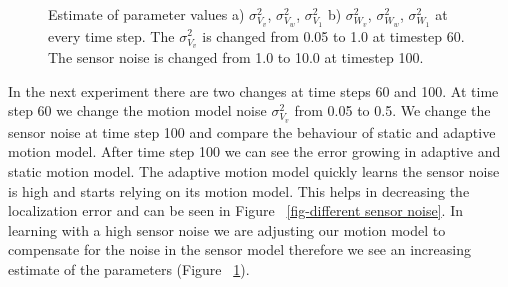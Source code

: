 \documentclass[12pt]{dalcsthesis}
\begin{document}
\begin{figure}[!ht]
  \centering
  \caption{\label{fig-different sensor noise motion model trans} Estimate of parameter values a) $\sigma_{V_{v}}^{2}$, $\sigma_{V_{w}}^{2}$,  $\sigma_{V_{1}}^{2}$ b) $\sigma_{W_{v}}^{2}$, $\sigma_{W_{w}}^{2}$, $\sigma_{W_{1}}^{2}$ at every time step. The $\sigma_{V_{v}}^{2}$ is changed from 0.05 to 1.0 at timestep 60. The sensor noise is changed from 1.0 to 10.0 at timestep 100.}
\end{figure}

In the next experiment there are two changes at time steps 60 and 100. At time step 60 we change the motion model noise $\sigma_{V_{v}}^2$ from 0.05 to 0.5. We change the sensor noise  at time step 100 and compare the behaviour of static and adaptive motion model. After time step 100 we can see the error growing in adaptive and static motion model. The adaptive motion model quickly learns the sensor noise is high and starts relying on its motion model. This helps in decreasing the localization error and can be seen in Figure ~\ref{fig-different sensor noise}. In learning with a high sensor noise we are adjusting our motion model to compensate for the noise in the sensor model therefore we see an increasing estimate of the parameters (Figure ~\ref{fig-different sensor noise motion model trans}).
\end{document}
